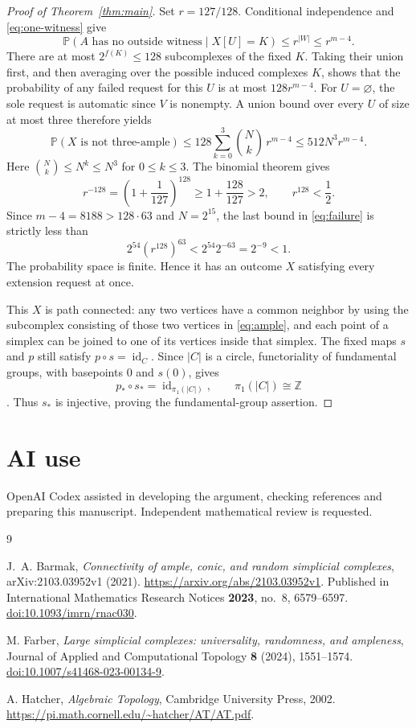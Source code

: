 \documentclass[11pt,a4paper]{article}
\newcommand{\Prob}{\mathbb{P}}
\begin{document}
\begin{proof}[Proof of Theorem~\ref{thm:main}]
Set $r=127/128$. Conditional independence and \eqref{eq:one-witness} give
\[
 \Prob(A\text{ has no outside witness}\mid X[U]=K)
 \leq r^{|W|}\leq r^{m-4}.
\]
There are at most $2^{f(K)}\leq128$ subcomplexes of the fixed $K$.
Taking their union first, and then averaging over the possible induced
complexes $K$, shows that the probability of any failed request for this
$U$ is at most $128r^{m-4}$. For $U=\varnothing$, the sole request is
automatic since $V$ is nonempty. A union bound over every $U$ of size
at most three therefore yields
\begin{equation}\label{eq:failure}
 \Prob(X\text{ is not three-ample})
 \leq128\sum_{k=0}^3\binom Nk\,r^{m-4}
 \leq512N^3r^{m-4}.
\end{equation}
Here $\binom Nk\leq N^k\leq N^3$ for $0\leq k\leq3$.
The binomial theorem gives
\[
 r^{-128}=\left(1+\frac1{127}\right)^{128}
 \geq1+\frac{128}{127}>2,
 \qquad r^{128}<\frac12.
\]
Since $m-4=8188>128\cdot63$ and $N=2^{15}$, the last bound in
\eqref{eq:failure} is strictly less than
\[
 2^{54}(r^{128})^{63}<2^{54}2^{-63}=2^{-9}<1.
\]
The probability space is finite. Hence it has an outcome $X$ satisfying
every extension request at once.

This $X$ is path connected: any two vertices have a common neighbor by
using the subcomplex consisting of those two vertices in \eqref{eq:ample},
and each point of a simplex can be joined to one of its vertices inside
that simplex. The fixed maps $s$ and $p$ still satisfy $p\circ s=
\operatorname{id}_C$. Since $|C|$ is a circle, functoriality of fundamental
groups, with basepoints $0$ and $s(0)$, gives
\[
 p_*\circ s_*=\operatorname{id}_{\pi_1(|C|)},\qquad
 \pi_1(|C|)\cong\mathbb{Z}
\]
\cite[Theorem~1.7 and p.~34]{Hatcher}. Thus $s_*$ is injective, proving
the fundamental-group assertion.
\end{proof}

\section*{AI use}
OpenAI Codex assisted in developing the argument, checking references and
preparing this manuscript. Independent mathematical review is requested.

\begin{thebibliography}{9}
\raggedright
{}
J.~A. Barmak, \emph{Connectivity of ample, conic, and random simplicial
complexes}, arXiv:2103.03952v1 (2021).
\url{https://arxiv.org/abs/2103.03952v1}.
Published in International Mathematics Research Notices \textbf{2023},
no.~8, 6579--6597.
\href{https://doi.org/10.1093/imrn/rnac030}{doi:10.1093/imrn/rnac030}.

M. Farber, \emph{Large simplicial complexes: universality, randomness, and
ampleness}, Journal of Applied and Computational Topology \textbf{8}
(2024), 1551--1574.
\href{https://doi.org/10.1007/s41468-023-00134-9}{doi:10.1007/s41468-023-00134-9}.

A. Hatcher, \emph{Algebraic Topology}, Cambridge University Press, 2002.
\url{https://pi.math.cornell.edu/~hatcher/AT/AT.pdf}.
\end{thebibliography}
\end{document}
